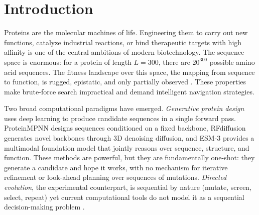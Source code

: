 \documentclass[12pt, a4paper]{article}
\begin{document}
\begin{abstract}
The system will be evaluated on ProteinGym, mega-scale stability data, and the combinatorially complete GB1 and TrpB landscapes, against greedy, search-based, and reinforcement-learning baselines, with uncertainty calibration and model-exploitation diagnostics reported alongside fitness.
\end{abstract}
\newpage

\section{Introduction}
\label{sec:introduction}

Proteins are the molecular machines of life. Engineering them to carry out new functions, catalyze industrial reactions, or bind therapeutic targets with high affinity is one of the central ambitions of modern biotechnology. The sequence space is enormous: for a protein of length $L = 300$, there are $20^{300}$ possible amino acid sequences. The fitness landscape over this space, the mapping from sequence to function, is rugged, epistatic, and only partially observed \citep{sandhu2025landscapes}. These properties make brute-force search impractical and demand intelligent navigation strategies.

Two broad computational paradigms have emerged. \textit{Generative protein design} uses deep learning to produce candidate sequences in a single forward pass. ProteinMPNN \citep{dauparas2022proteinmpnn} designs sequences conditioned on a fixed backbone, RFdiffusion \citep{watson2023rfdiffusion} generates novel backbones through 3D denoising diffusion, and ESM-3 \citep{hayes2024esm3} provides a multimodal foundation model that jointly reasons over sequence, structure, and function. These methods are powerful, but they are fundamentally one-shot: they generate a candidate and hope it works, with no mechanism for iterative refinement or look-ahead planning over sequences of mutations. \textit{Directed evolution}, the experimental counterpart, is sequential by nature (mutate, screen, select, repeat) yet current computational tools do not model it as a sequential decision-making problem \citep{notin2024mlprotein, kyro2025review}.
\end{document}
